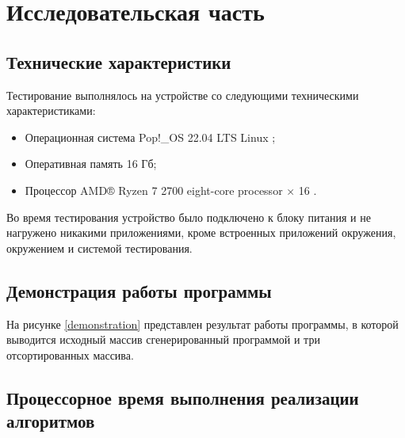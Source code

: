 \chapter{Исследовательская часть}
\section{Технические характеристики}
Тестирование выполнялось на устройстве со следующими техническими характеристиками:
\begin{itemize}
	\item Операционная система Pop!\_OS 22.04 LTS \cite{ubuntu} Linux \cite{linux};
	\item Оперативная память 16 Гб;
	\item Процессор AMD® Ryzen 7 2700 eight-core processor × 16 \cite{amd}.
\end{itemize}

Во время тестирования устройство было подключено к блоку питания и не нагружено никакими приложениями, кроме встроенных приложений окружения, окружением и системой тестирования.

\section{Демонстрация работы программы}



На рисунке \ref{demonstration} представлен результат работы программы, в которой выводится исходный массив сгенерированный программой и три отсортированных массива.


\newpage

\section{Процессорное время выполнения реализации алгоритмов}

